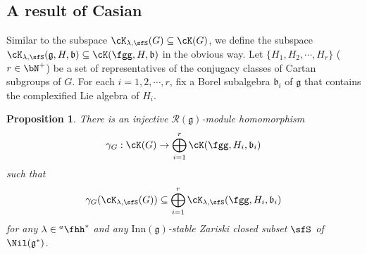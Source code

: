 \documentclass[12pt,a4paper]{amsart}
\def\subset{\subseteq}
\newcommand{\g}{\mathfrak g}
\renewcommand{\b}{\mathfrak b}
\newcommand{\be}{\begin {equation}}
\newcommand{\ee}{\end {equation}}
\numberwithin{equation}{section}
\newtheorem{prop}[thm]{Proposition}
\theoremstyle{remark}
\def\hha{{}^a\fhh}
\def\Inn{\mathrm{Inn}}
\newcommand{\Grt}{\cK}
\begin{document}
\subsection{A result of Casian}

 Similar to the subspace $\Grt_{\lambda, \sfS}(G)\subset \Grt(G)$, we define the subspace $\Grt_{\lambda, \sfS}(\g,H,\b)\subset \Grt(\fgg,H,\b)$ in the obvious way.
Let $\{H_1, H_2, \cdots, H_r\}$ ($r\in \bN^+$) be  a set of representatives of the
conjugacy classes of Cartan subgroups of $G$. For each $i=1,2,\cdots, r$, fix a Borel subalgebra $\b_i$ of $\g$ that contains the complexified Lie algebra of $H_i$.

 \begin{prop}\label{cor:HC.embed}
 There is an injective $\mathcal R(\g)$-module homomorphism
 \[
\gamma_{G}: \Grt(G)\rightarrow  \bigoplus_{i=1}^{r} \Grt(\fgg,H_{i},\b_{i})
 \]
 such that
 \be\label{gammag}
   \gamma_{G}(\Grt_{\lambda, \sfS}(G))\subset  \bigoplus_{i=1}^{r} \Grt_{\lambda, \sfS}(\fgg,H_{i},\b_{i})
 \ee
 for any $\lambda\in \hha^*$ and any $\Inn(\g)$-stable Zariski closed subset $\sfS$ of $\Nil(\g^*)$.

 \end{prop}
\end{document}
